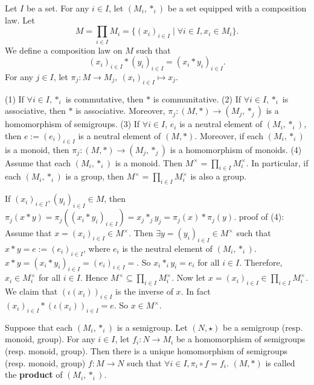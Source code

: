\begin{definitionenv}
    Let $I$ be a set. For any $i\in I$,  let $(M_i, *_i)$ be a set equipped with a composition law. Let 
    $$M=\prod_{i\in I}M_i=\{(x_i)_{i\in I}\mid \forall i\in I, x_i\in M_i\}.$$ 
    We define a composition law on $M$ such that 
    $$(x_i)_{i\in I}*(y_i)_{i\in I}=(x_i*y_i)_{i\in I}.$$
    For any $j\in I$,  let $\pi_j:M\rightarrow M_j, \ (x_i)_{i\in I}\mapsto x_j$.
\end{definitionenv}
\begin{propositionenv}
    \quad 
    \newline
    (1) If $\forall i\in I,  *_i$ is commutative,  then $*$ is communitative.
    \newline
    (2) If $\forall i\in I,  *_i$ is associative,  then $*$ is associative. Moreover,  $\pi_j:(M, *)\rightarrow (M_j, *_j)$ is a homomorphism of semigroups.
    \newline
    (3) If $\forall i\in I$,  $e_i$ is a neutral element of $(M_i, *_i)$,  then $e:=(e_i)_{i\in I}$ is a neutral element of $(M, *)$. Moreover,  if each $(M_i, *_i)$ is a monoid,  then $\pi_j:(M, *)\rightarrow (M_j, *_j)$ is a homomorphism of monoids.
    \newline
    (4) Assume that each $(M_i, *_i)$ is a monoid. Then $M^\times=\prod_{i\in I}M_i^\times$. In particular,  if each $(M_i, *_i)$ is a group,  then $M^\times=\prod_{i\in I}M_i^\times$ is also a group.
\end{propositionenv}
\begin{proofenv}
    If $(x_i)_{i\in I},  (y_i)_{i\in I}\in M$,  then $\pi_j(x*y)=\pi_j((x_i*y_i)_{i\in I})=x_j*_jy_j=\pi_j(x)*\pi_j(y)$.
    \newline
    proof of (4): Assume that $x=(x_i)_{i\in I}\in M^\times$. Then $\exists y=(y_i)_{i\in I}\in M^\times$ such that $x*y=e:=(e_i)_{i\in I}$,  where $e_i$ is the neutral element of $(M_i, *_i)$. $x*y=(x_i*y_i)_{i\in I}=(e_i)_{i\in I}=$. So $x_i*_iy_i=e_i$ for all $i\in I$. Therefore,  $x_i\in M_i^\times$ for all $i\in I$. Hence $M^\times\subseteq\prod_{i\in I}M_i^\times$.
    Now let $x=(x_i)_{i\in I}\in \prod_{i\in I}M_i^\times$. We claim that $(\iota(x_i))_{i\in I}$ is the inverse of $x$. In fact $(x_i)_{i\in I}*(\iota(x_i))_{i\in I}=e$. So $x\in M^\times$.
\end{proofenv}
\begin{theoremenv}
    Suppose that each $(M_i, *_i)$ is a semigroup. Let $(N, \star)$ be a semigroup (resp. monoid,  group). For any $i\in I$,  let $f_i:N\rightarrow M_i$ be a homomorphism of semigroups (resp. monoid,  group). Then there is a unique homomorphism of semigroups (resp. monoid,  group) $f:M\rightarrow N$ such that $\forall i\in I,  \pi_i\circ f=f_i$.
    \newline
    $(M, *)$ is called the \textbf{product} of $(M_i, *_i)$.
\end{theoremenv}
